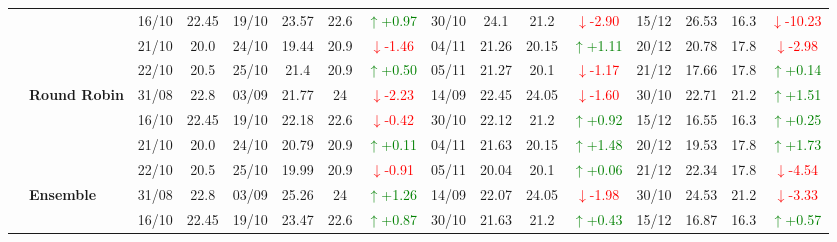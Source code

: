 \documentclass{ieeeaccess}
\begin{document}
{\begin{longtable}{llcc|cccc|cccc|cccc}
& 
& 16/10 & 22.45 & 19/10 & 23.57 & 22.6 & \textcolor{green}{\(\uparrow\)+0.97} & 30/10 & 24.1 & 21.2 & \textcolor{red}{\(\downarrow\)-2.90} & 15/12 & 26.53 & 16.3 & \textcolor{red}{\(\downarrow\)-10.23} \\

& 
& 21/10 & 20.0 & 24/10 & 19.44 & 20.9 & \textcolor{red}{\(\downarrow\)-1.46} & 04/11 & 21.26 & 20.15 & \textcolor{green}{\(\uparrow\)+1.11} & 20/12 & 20.78 & 17.8 & \textcolor{red}{\(\downarrow\)-2.98} \\

&
& 22/10 & 20.5 & 25/10 & 21.4 & 20.9 & \textcolor{green}{\(\uparrow\)+0.50} & 05/11 & 21.27 & 20.1 & \textcolor{red}{\(\downarrow\)-1.17} & 21/12 & 17.66 & 17.8 & \textcolor{green}{\(\uparrow\)+0.14} \\
\cmidrule(lr){2-16}


& \textbf{Round Robin}
& 31/08 & 22.8 & 03/09 & 21.77 & 24 & \textcolor{red}{\(\downarrow\)-2.23} & 14/09 & 22.45 & 24.05 & \textcolor{red}{\(\downarrow\)-1.60} & 30/10 & 22.71 & 21.2 & \textcolor{green}{\(\uparrow\)+1.51} \\

&
& 16/10 & 22.45 & 19/10 & 22.18 & 22.6 & \textcolor{red}{\(\downarrow\)-0.42} & 30/10 & 22.12 & 21.2 & \textcolor{green}{\(\uparrow\)+0.92} & 15/12 & 16.55 & 16.3 & \textcolor{green}{\(\uparrow\)+0.25} \\

&
& 21/10 & 20.0 & 24/10 & 20.79 & 20.9 & \textcolor{green}{\(\uparrow\)+0.11} & 04/11 & 21.63 & 20.15 & \textcolor{green}{\(\uparrow\)+1.48} & 20/12 & 19.53 & 17.8 & \textcolor{green}{\(\uparrow\)+1.73} \\

&
& 22/10 & 20.5 & 25/10 & 19.99 & 20.9 & \textcolor{red}{\(\downarrow\)-0.91} & 05/11 & 20.04 & 20.1 & \textcolor{green}{\(\uparrow\)+0.06} & 21/12 & 22.34 & 17.8 & \textcolor{red}{\(\downarrow\)-4.54} \\
\cmidrule(lr){2-16}


& \textbf{Ensemble}
& 31/08 & 22.8 & 03/09 & 25.26 & 24 & \textcolor{green}{\(\uparrow\)+1.26} & 14/09 & 22.07 & 24.05 & \textcolor{red}{\(\downarrow\)-1.98} & 30/10 & 24.53 & 21.2 & \textcolor{red}{\(\downarrow\)-3.33} \\

&
& 16/10 & 22.45 & 19/10 & 23.47 & 22.6 & \textcolor{green}{\(\uparrow\)+0.87} & 30/10 & 21.63 & 21.2 & \textcolor{green}{\(\uparrow\)+0.43} & 15/12 & 16.87 & 16.3 & \textcolor{green}{\(\uparrow\)+0.57} \\


\end{longtable}}
\end{document}
